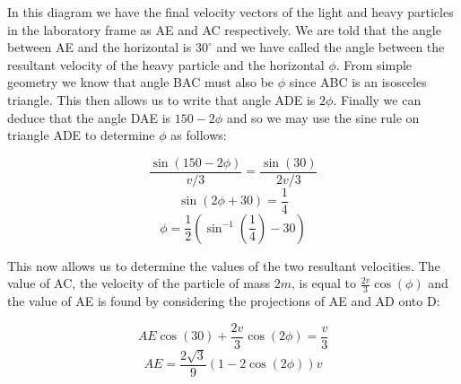 \begin{problem}
{In this diagram we have the final velocity vectors of the light and heavy particles in the laboratory frame as AE and AC respectively. We are told that the angle between AE and the horizontal is $30^\circ$ and we have called the angle between the resultant velocity of the heavy particle and the horizontal $\phi$. From simple geometry we know that angle BAC must also be $\phi$ since ABC is an isosceles triangle. This then allows us to write that angle ADE is $2\phi$. Finally we can deduce that the angle DAE is $150-2\phi$ and so we may use the sine rule on triangle ADE to determine $\phi$ as follows:

\begin{equation*}\frac{\sin{(150-2\phi)}}{v/3}=\frac{\sin{(30)}}{2v/3}\end{equation*}
\begin{equation*}\sin{(2\phi+30)}=\frac{1}{4}\end{equation*}
\begin{equation*}\phi=\frac{1}{2}(\sin^{-1}{(\frac{1}{4})}-30)\end{equation*}

This now allows us to determine the values of the two resultant velocities. The value of AC, the velocity of the particle of mass $2m$, is equal to $\frac{2v}{3}\cos{(\phi)}$ and the value of AE is found by considering the projections of AE and AD onto D:

\begin{equation*}AE\cos{(30)}+\frac{2v}{3}\cos{(2\phi)}=\frac{v}{3}\end{equation*}
\begin{equation*}AE=\frac{2\sqrt{3}}{9}(1-2\cos{(2\phi)})v\end{equation*}

}
\end{problem}